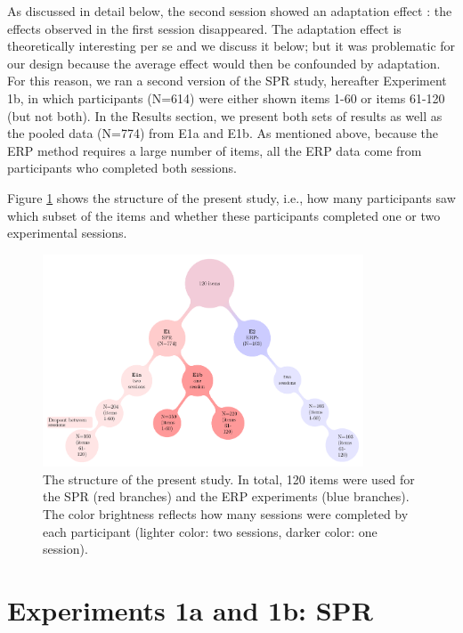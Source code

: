 \documentclass[a4paper, man, floatsintext]{apa7}
\begin{document}
As discussed in detail below, the second session showed an adaptation effect \parencite{prasad2021rapid}: the effects observed in the first session disappeared. The adaptation effect is theoretically interesting per se \parencite{fine2013rapid} and we discuss it below; but it was problematic for our design because the average effect would then be confounded by adaptation. For this reason, we ran a second version of the SPR study, hereafter Experiment 1b, in which participants (N=614) were either shown items 1-60 or items 61-120 (but not both). In the Results section, we present both sets of results as well as the pooled data (N=774) from E1a and E1b.
As mentioned above, because the ERP method requires a large number of items, all the ERP data come from participants who completed both sessions. 

Figure \ref{fig:project_str} shows the structure of the present study, i.e., how many participants saw which subset of the items and whether these participants completed one or two experimental sessions.

\begin{figure}[H]
    \caption{The structure of the present study. In total, 120 items were used for the SPR (red branches) and the ERP experiments (blue branches). The color brightness reflects how many sessions were completed by each participant (lighter color: two sessions, darker color: one session).}
    \label{fig:project_str}
    \centering
    \includegraphics[width=0.85\textwidth]{images/pandora_project_structure_figure.pdf}
\end{figure}


\section{Experiments 1a and 1b: SPR}
\end{document}
